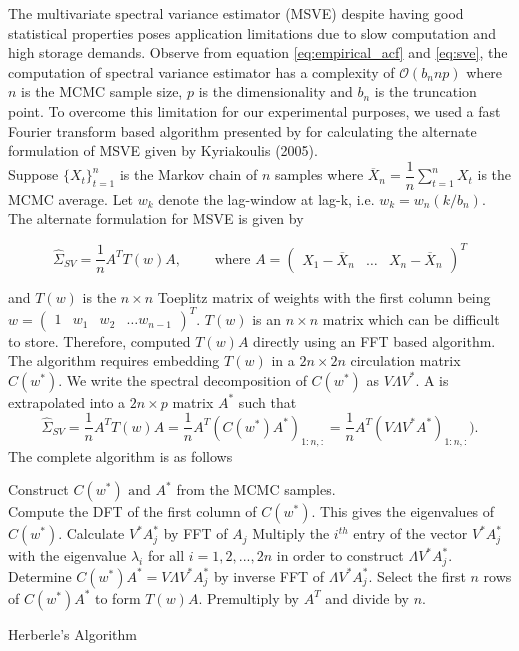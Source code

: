 \documentclass[11pt]{article}
\theoremstyle{remark}
\begin{document}
The multivariate spectral variance estimator (MSVE) despite having good statistical properties poses application limitations due to slow computation and high storage demands. Observe from equation \ref{eq:empirical_acf} and \ref{eq:sve}, the computation of spectral variance estimator has a complexity of $\mathcal{O}(b_n n p)$ where $n$ is the MCMC sample size, $p$ is the dimensionality and $b_n$ is the truncation point. To overcome this limitation for our experimental purposes, we used a fast Fourier transform based algorithm presented by \cite{heberle2017fast} for calculating the alternate formulation of MSVE given by Kyriakoulis (2005).\\

Suppose $\{X_t\}_{t=1}^n$ is the Markov chain of $n$ samples where $\overline{X}_n = \dfrac{1}{n}\sum_{t=1}^{n}X_t$ is the MCMC average. Let $w_k$ denote the lag-window at lag-k, i.e. $w_k = w_n(k/b_n)$. The alternate formulation for MSVE is given by

\begin{equation} \label{eq:Kyriakoulis_sv}
    \hat{\Sigma}_{SV} = \dfrac{1}{n}A^T T(w) A, \qquad \textrm{ where } A = \begin{pmatrix}
    X_1 - \overline{X}_n  & \dots & X_n - \overline{X}_n
\end{pmatrix}^T
\end{equation}

and $T(w)$ is the $n \times n$ Toeplitz matrix of weights with the first column being $w = 
\begin{pmatrix}
    1 & w_1 & w_2 & \dots w_{n-1}
\end{pmatrix}^T$.
$T(w)$ is an $n \times n$ matrix which can be difficult to store. Therefore, \cite{heberle2017fast} computed $T(w)A$ directly using an FFT based algorithm. The algorithm requires embedding $T(w)$ in a $2n \times 2n$ circulation matrix $C(w^*)$. We write the spectral decomposition of $C(w^*)$ as $V\Lambda V^*$. A is extrapolated into a $2n \times p$ matrix $A^*$ such that
\[
    \hat{\Sigma}_{SV} = \dfrac{1}{n} A^T T(w) A = \dfrac{1}{n} A^T (C(w^*) A^*)_{1:n, :} = \dfrac{1}{n} A^T (V \Lambda V^* A^*)_{1:n, :}).
\]
The complete algorithm is as follows
\\
\begin{algorithm}[H]
\DontPrintSemicolon
\SetAlgoLined

Construct $C(w^*) \textrm{ and } A^*$ from the MCMC samples.\\ Compute the DFT of the first column of $C(w^*)$. This gives the eigenvalues of $C(w^*)$.\;
    { 
    Calculate $V^*A_j^*$ by FFT of $A_j$\;
    Multiply the $i^{th}$ entry of the vector $V^* A_j^*$ with the eigenvalue $\lambda_i$ for all $i = 1, 2, ..., 2n$ in order to construct $\Lambda V^* A_j^*$.\;
    Determine $C(w^*)A^* = V \Lambda V^* A_j^*$ by inverse FFT of $\Lambda V^* A_j^*$.\;
    }
 Select the first $n$ rows of $C(w^*)A^*$ to form $T(w)A$.\;
 Premultiply by $A^T$ and divide by $n$.
 \caption{Herberle's Algorithm}
\end{algorithm}
\end{document}
